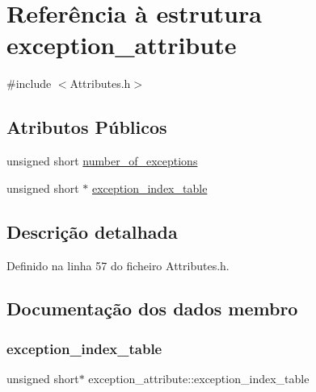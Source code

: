 \hypertarget{structexception__attribute}{}\section{Referência à estrutura exception\+\_\+attribute}
\label{structexception__attribute}


{\ttfamily \#include $<$Attributes.\+h$>$}

\subsection*{Atributos Públicos}
\begin{DoxyCompactItemize}
\item 
unsigned short \hyperlink{structexception__attribute_a40daaffb1cea794d6b65513bc7639d88}{number\+\_\+of\+\_\+exceptions}
\item 
unsigned short $\ast$ \hyperlink{structexception__attribute_a017de83073154b04633ebe00dfb77932}{exception\+\_\+index\+\_\+table}
\end{DoxyCompactItemize}


\subsection{Descrição detalhada}


Definido na linha 57 do ficheiro Attributes.\+h.



\subsection{Documentação dos dados membro}
\mbox{\label{structexception__attribute_a017de83073154b04633ebe00dfb77932}} 
\subsubsection{\texorpdfstring{exception\+\_\+index\+\_\+table}{exception\_index\_table}}
{\footnotesize\ttfamily unsigned short$\ast$ exception\+\_\+attribute\+::exception\+\_\+index\+\_\+table}



